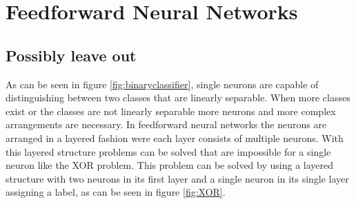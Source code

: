 
\section{Feedforward Neural Networks}
\label{sec:feedworwardNUsing a threshold function for $g$, points are given a hard label, either belonging to class $0$ or $1$, depending on their relative position to the decision hypersurface.etworks}

\subsection{Possibly leave out}
As can be seen in figure \ref{fig:binaryclassifier}, single neurons are capable of distinguishing between two classes that are linearly separable. When more classes exist or the classes are not linearly separable more neurons and more complex arrangements are necessary. In feedforward neural networks the neurons are arranged in a layered fashion were each layer consists of multiple neurons. With this layered structure problems can be solved that are impossible for a single neuron like the XOR problem. This problem can be solved by using a layered structure with two neurons in its first layer and a single neuron in its single layer assigning a label, as can be seen in figure \ref{fig:XOR}. \\

